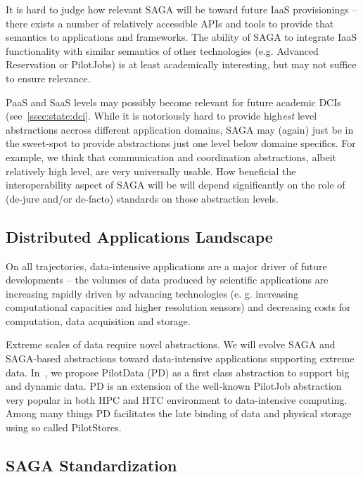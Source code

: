 \documentclass{article}
\newcommand{\I}[1]{\textit{#1}}
\begin{document}
  It is hard to judge how relevant SAGA will be toward future IaaS
  provisionings -- there exists a number of relatively accessible APIs
  and tools to provide that semantics to applications and frameworks.
  The ability of SAGA to integrate IaaS functionality with similar
  semantics of other technologies (e.g. Advanced Reservation or
  PilotJobs) is at least academically interesting, but may not suffice
  to ensure relevance.

  PaaS and SaaS levels may possibly become relevant for future
  academic DCIs (see~\ref{ssec:state:dci}.  While it is notoriously
  hard to provide high\I{est} level abstractions accross different
  application domains, SAGA may (again) just be in the sweet-spot to
  provide abstractions just one level below domaine specifics.  For
  example, we think that communication and coordination abstractions,
  albeit relatively high level, are very universally usable.  How
  beneficial the interoperability aspect of SAGA will be will depend
  significantly on the role of (de-jure and/or de-facto) standards on
  those abstraction levels.


 \subsection{Distributed Applications Landscape}
 
  On all trajectories, data-intensive applications are a major driver of
  future developments -- the volumes of data produced by scientific
  applications are increasing rapidly driven by advancing technologies
  (e. g. increasing computational capacities and higher resolution
  sensors) and decreasing costs for computation, data acquisition and
  storage.

  Extreme scales of data require novel abstractions. We will evolve SAGA
  and SAGA-based abstractions toward data-intensive applications
  supporting extreme data.  In~\cite{troy-2011}, we propose PilotData
  (PD) as a first class abstraction to support big and dynamic data. PD
  is an extension of the well-known PilotJob abstraction very popular in
  both HPC and HTC environment to data-intensive computing.  Among many
  things PD facilitates the late binding of data and physical storage
  using so called PilotStores.

 \subsection{SAGA Standardization}
\end{document}

